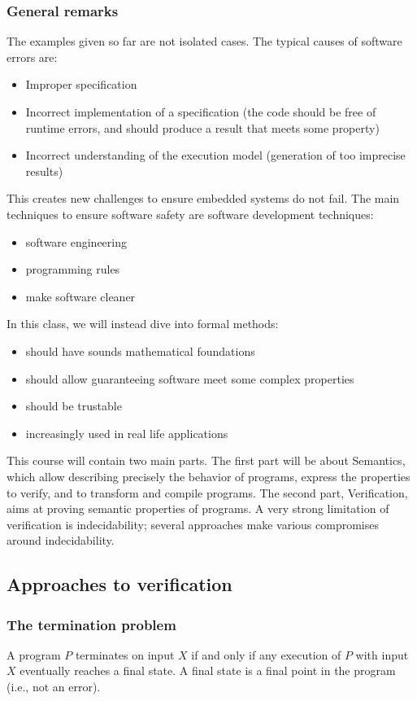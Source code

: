 \documentclass[toc, titlepaged]{../cs-classes/cs-classes}
\begin{document}
\subsubsection{General remarks}
The examples given so far are not isolated cases. The typical causes of software errors are:
\begin{itemize}
    \item Improper specification
    \item Incorrect implementation of a specification (the code should be free of runtime errors, and should produce a result that meets some property)
    \item Incorrect understanding of the execution model (generation of too imprecise results)
\end{itemize}

This creates new challenges to ensure embedded systems do not fail. The main techniques to ensure software safety are software development techniques:
\begin{itemize}
    \item software engineering
    \item programming rules
    \item make software cleaner
\end{itemize}

In this class, we will instead dive into formal methods:
\begin{itemize}
    \item should have sounds mathematical foundations
    \item should allow guaranteeing software meet some complex properties
    \item should be trustable
    \item increasingly used in real life applications
\end{itemize}

This course will contain two main parts. The first part will be about Semantics, which allow describing precisely the behavior of programs, express the properties to verify, and to transform and compile programs. The second part, Verification, aims at proving semantic properties of programs. A very strong limitation of verification is indecidability; several approaches make various compromises around indecidability.

\subsection{Approaches to verification}
\subsubsection{The termination problem}
\begin{definition}[Termination]
    A program $P$ terminates on input $X$ if and only if any execution of $P$ with input $X$ eventually reaches a final state. A final state is a final point in the program (i.e., not an error).
\end{definition}
\end{document}
